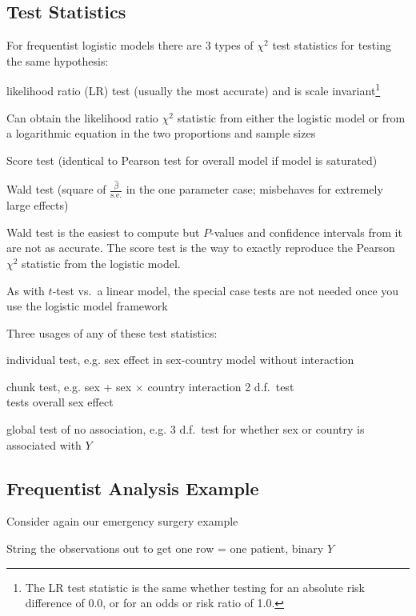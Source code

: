 \subsection{Test Statistics}
For frequentist logistic models there are 3 types of $\chi^2$ test statistics for testing the same hypothesis:
  \bi
  \item likelihood ratio (LR) test (usually the most accurate) and is scale invariant\footnote{The LR test statistic is the same whether testing for an absolute risk difference of 0.0, or for an odds or risk ratio of 1.0.}
   \bi
   \item Can obtain the likelihood ratio $\chi^2$ statistic from either the logistic model or from a logarithmic equation in the two proportions and sample sizes
   \ei
  \item Score test (identical to Pearson test for overall model if model is saturated)
  \item Wald test (square of $\frac{\hat{\beta}}{\textrm{s.e.}}$ in the one parameter case; misbehaves for extremely large effects)
  \item Wald test is the easiest to compute but $P$-values and confidence intervals from it are not as accurate.  The score test is the way to exactly reproduce the Pearson $\chi^2$ statistic from the logistic model.
  \item As with $t$-test vs.\ a linear model, the special case tests are not needed once you use the logistic model framework
  \item Three usages of any of these test statistics:
    \bi
    \item individual test, e.g. sex effect in sex-country model without interaction
    \item chunk test, e.g. sex + sex $\times$ country interaction 2 d.f.\ test\\tests overall sex effect
    \item global test of no association, e.g. 3 d.f.\ test for whether sex or country is associated with $Y$
    \ei
  \ei
 
\subsection{Frequentist Analysis Example}
 \bi
 \item Consider again our emergency surgery example
 \item String the observations out to get one row = one patient, binary $Y$
 \ei

